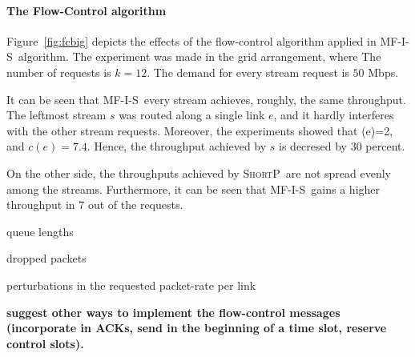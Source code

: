 \documentclass[12pt]{article}
\newenvironment{proof sketch}[1]{\noindent {\emph{Proof sketch of #1:}}}{\hfill \qed}
\newcommand{\MCS}{\text{\sc{mcs}}}
\newcommand{\algA}{\textsc{MF-I-S}}
\newcommand{\algB}{\textsc{ShortP}}
\newcommand{\algS}{\algB}
\begin{document}
\paragraph{The Flow-Control algorithm}

Figure~\ref{fig:fcbig} depicts the effects of the flow-control algorithm applied in \algA\ algorithm.
The experiment was made in the grid arrangement, where The number of requests is $k=12$.
The demand for every stream request is $50$ Mbps.



It can be seen that \algA\ every stream achieves, roughly, the same throughput.
The leftmost stream $s$ was routed along a single link $e$, and it hardly interferes with the other stream requests.
Moreover, the experiments showed that \MCS(e)=2, and $c(e)=7.4$.
Hence, the throughput achieved by $s$ is decresed by $30$ percent.

On the other side, the throughputs achieved by \algS\ are not spread evenly among the streams.
Furthermore, it can be seen that \algA\ gains a higher throughput in  $7$ out of the requests.

queue lengths

dropped packets

perturbations in the requested packet-rate per link

\textbf{suggest other ways to implement the flow-control messages (incorporate
in ACKs, send in the beginning of a time slot, reserve control slots).}
\end{document}
